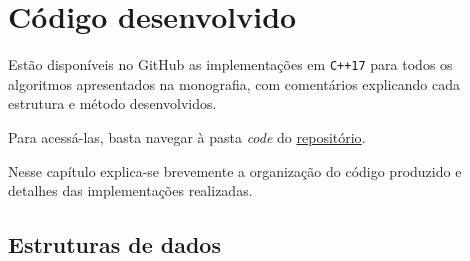 \chapter{Código desenvolvido}
\label{cap:code}

Estão disponíveis no GitHub as implementações em \texttt{C++17} para todos os algoritmos apresentados na monografia, com comentários explicando cada estrutura e método desenvolvidos.

Para acessá-las, basta navegar à pasta \textit{code} do \href{github.com/gafeol/chinese-postman/}{repositório}.

Nesse capítulo explica-se brevemente a organização do código produzido e detalhes das implementações realizadas.

\section{Estruturas de dados}

